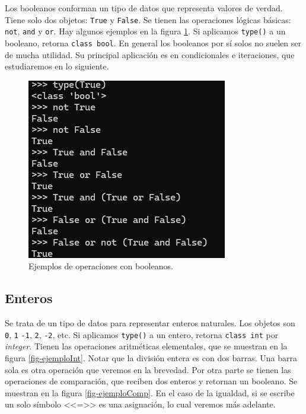 \documentclass[a4paper, 12pt]{report}
\theoremstyle{definition}
\begin{document}
Los booleanos conforman un tipo de datos que representa valores de verdad. Tiene solo dos objetos: {\tt True} y {\tt False}. Se tienen las operaciones lógicas básicas: {\tt not}, {\tt and} y {\tt or}. Hay algunos ejemplos en la figura \ref{fig-ejemploBool}. Si aplicamos {\tt type()} a un booleano, retorna {\tt class bool}. En general los booleanos por sí solos no suelen ser de mucha utilidad. Su principal aplicación es en condicionales e iteraciones, que estudiaremos en lo siguiente. 

\begin{figure}
	\centering
	\includegraphics[scale=0.6]{ejemploBool.png}
	\caption{Ejemplos de operaciones con booleanos.}
	\label{fig-ejemploBool}
\end{figure}

\subsection{Enteros}

Se trata de un tipo de datos para representar enteros naturales. Los objetos son {\tt 0}, {\tt 1} {\tt -1}, {\tt 2}, {\tt -2}, etc. Si aplicamos {\tt type()} a un entero, retorna {\tt class int} por {\sl integer}. Tienen las operaciones aritméticas elementales, que se muestran en la figura \ref{fig-ejemploInt}. Notar que la división entera es con dos barras. Una barra sola es otra operación que veremos en la brevedad. Por otra parte se tienen las operaciones de comparación, que reciben dos enteros y retornan un booleano. Se muestran en la figura \ref{fig-ejemploComp}. En el caso de la igualdad, si se escribe un solo símbolo <<=>> es una asignación, lo cual veremos más adelante.
\end{document}
